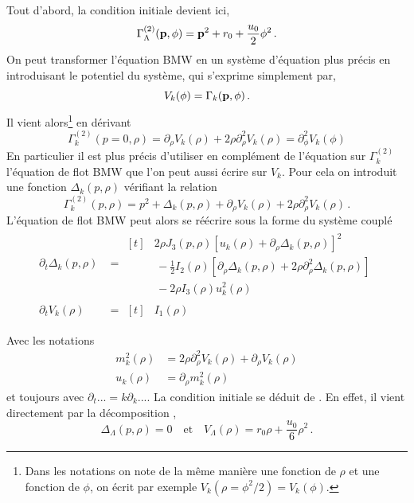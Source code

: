 \documentclass[10.5pt]{article}
\begin{document}
\begin{multicols*}{2}
Tout d'abord, la condition initiale  devient ici,
\begin{equation}
	\Gamma^{(2)}_\Lambda({\bf p}, \phi) = {\bf p}^2 + r_0 + \frac{u_0}{2} \phi^2 \, .
	\label{eq:initBMWCont}
\end{equation}
On peut transformer l'équation BMW en un système d'équation plus précis en introduisant le potentiel du système, qui s'exprime simplement par,   
\begin{equation}
	V_k(\phi) = \Gamma_k({\bf p}, \phi) \, .
\end{equation}
Il vient alors\footnote{Dans les notations on note de la même manière une fonction de $\rho$ et une fonction de $\phi$, on écrit par exemple $V_k(\rho = \phi^2/2) = V_k(\phi)$.} en dérivant
\begin{equation}
	\Gamma^{(2)}_k(p=0, \rho) = \partial_{\rho}V_k(\rho) + 2\rho\partial_{\rho}^2 V_k(\rho) = \partial_{\phi}^2 V_k(\phi)
\end{equation}
En particulier il est plus précis d'utiliser en complément de l'équation sur $\Gamma^{(2)}_k$ l'équation de flot BMW que l'on peut aussi écrire sur $V_k$. Pour cela on introduit une fonction $\Delta_k(p, \rho)$ vérifiant la relation
\begin{equation}
	\Gamma^{(2)}_k(p, \rho) = p^2 + \Delta_k(p, \rho) + \partial_{\rho}V_k(\rho) + 2\rho\partial_{\rho}^2 V_k(\rho) \, .
	\label{eq:gammaDecomp}
\end{equation}
L'équation de flot BMW  peut alors se réécrire sous la forme du système couplé
\begin{align}
	\partial_t \Delta_k(p, \rho) & = 
	\begin{aligned}[t]
	 & 2\rho J_3(p,\rho){\left[u_k(\rho) + \partial_\rho \Delta_k (p,\rho) \right]}^{2} \\
	  & \, - \frac{1}{2}I_2(\rho) \left[\partial_\rho \Delta_k(p, \rho) +  2\rho \partial_\rho^2 \Delta_k(p,\rho) \right] \\
	 & \, - 2\rho I_3 (\rho) u_k^2(\rho) 
	 \end{aligned}
	\label{eqn:sysDeltaON1}\\
	\partial_t V_k(\rho) & = 
	\begin{aligned}[t]
		& I_1(\rho)
	\end{aligned}
	\label{eqn:sysDeltaON2}
\end{align}

Avec les notations
\begin{equation}
 \begin{split}
	m_k^2(\rho) & = 2\rho \partial_\rho^2 V_k(\rho) + \partial_\rho V_k(\rho)  \\
	u_k(\rho)  & = \partial_\rho m^2_k(\rho) \, 
	\end{split}	
\end{equation}
et toujours avec $\partial_t ... = k \partial_k ... $. La condition initiale se déduit de . En effet, il vient directement par la décomposition ,
\begin{equation}
\Delta_\Lambda (p,\rho) = 0 \quad \text{et} \quad V_\Lambda(\rho) = r_0\rho + \frac{u_0}{6}\rho^2 \, .
\end{equation}


\end{multicols*}
\end{document}
